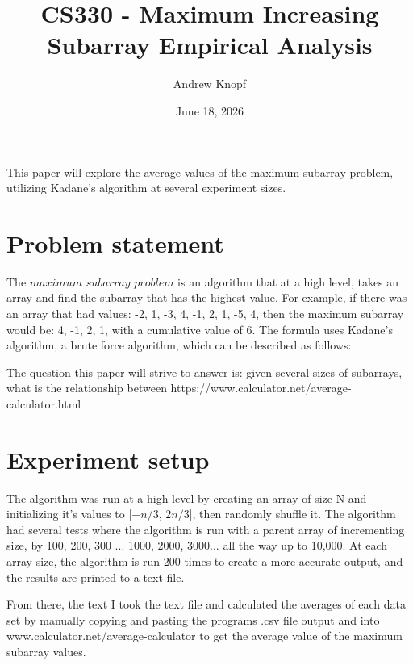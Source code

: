 \documentclass {article}
\title {CS330 - Maximum Increasing Subarray Empirical Analysis}
\author {Andrew Knopf}
\date {June 18, 2026}
\begin{document}
\maketitle
This paper will explore the average values of the maximum subarray problem, utilizing Kadane's algorithm at several experiment sizes.


\section {Problem statement}
\indent\par The $maximum$ $subarray$ $problem$ is an algorithm that at a high level, takes an array and find the subarray that has the highest value. For example, if there was an array that had values: -2, 1, -3, 4, -1, 2, 1, -5, 4, then the maximum subarray would be: 4, -1, 2, 1, with a cumulative value of 6. The formula uses Kadane's algorithm, a brute force algorithm, which can be described as follows:

The question this paper will strive to answer is: given several sizes of subarrays, what is the relationship between 
https://www.calculator.net/average-calculator.html
\section {Experiment setup}
\indent \par The algorithm was run at a high level by creating an array of size N and initializing it's values to [$-n/3$, $2n/3$], then randomly shuffle it. The algorithm had several tests where the algorithm is run with a parent array of incrementing size, by 100, 200, 300 ... 1000, 2000, 3000... all the way up to 10,000. At each array size, the algorithm is run 200 times to create a more accurate output, and the results are printed to a text file. 
\par From there, the text I took the text file and calculated the averages of each data set by manually copying and pasting the programs .csv file output and into www.calculator.net/average-calculator to get the average value of the maximum subarray values.
\end{document}

